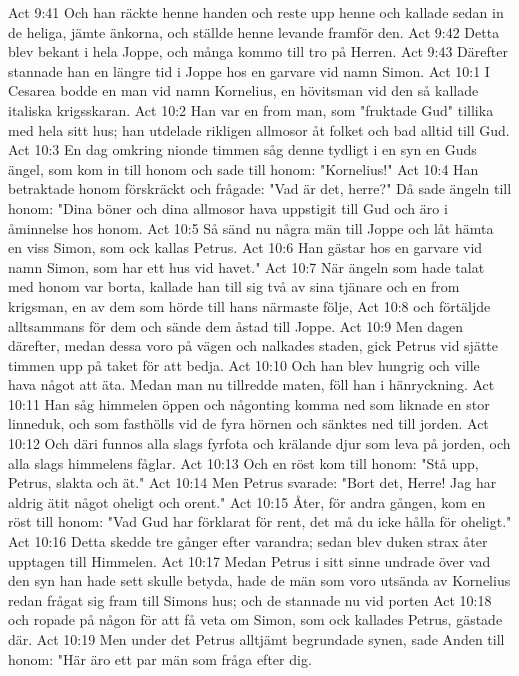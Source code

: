 Act 9:41  Och han räckte henne handen och reste upp henne och kallade sedan in de heliga, jämte änkorna, och ställde henne levande framför den.
Act 9:42  Detta blev bekant i hela Joppe, och många kommo till tro på Herren.
Act 9:43  Därefter stannade han en längre tid i Joppe hos en garvare vid namn Simon.
Act 10:1  I Cesarea bodde en man vid namn Kornelius, en hövitsman vid den så kallade italiska krigsskaran.
Act 10:2  Han var en from man, som "fruktade Gud" tillika med hela sitt hus; han utdelade rikligen allmosor åt folket och bad alltid till Gud.
Act 10:3  En dag omkring nionde timmen såg denne tydligt i en syn en Guds ängel, som kom in till honom och sade till honom: "Kornelius!"
Act 10:4  Han betraktade honom förskräckt och frågade: "Vad är det, herre?" Då sade ängeln till honom: "Dina böner och dina allmosor hava uppstigit till Gud och äro i åminnelse hos honom.
Act 10:5  Så sänd nu några män till Joppe och låt hämta en viss Simon, som ock kallas Petrus.
Act 10:6  Han gästar hos en garvare vid namn Simon, som har ett hus vid havet."
Act 10:7  När ängeln som hade talat med honom var borta, kallade han till sig två av sina tjänare och en from krigsman, en av dem som hörde till hans närmaste följe,
Act 10:8  och förtäljde alltsammans för dem och sände dem åstad till Joppe.
Act 10:9  Men dagen därefter, medan dessa voro på vägen och nalkades staden, gick Petrus vid sjätte timmen upp på taket för att bedja.
Act 10:10  Och han blev hungrig och ville hava något att äta. Medan man nu tillredde maten, föll han i hänryckning.
Act 10:11  Han såg himmelen öppen och någonting komma ned som liknade en stor linneduk, och som fasthölls vid de fyra hörnen och sänktes ned till jorden.
Act 10:12  Och däri funnos alla slags fyrfota och krälande djur som leva på jorden, och alla slags himmelens fåglar.
Act 10:13  Och en röst kom till honom: "Stå upp, Petrus, slakta och ät."
Act 10:14  Men Petrus svarade: "Bort det, Herre! Jag har aldrig ätit något oheligt och orent."
Act 10:15  Åter, för andra gången, kom en röst till honom: "Vad Gud har förklarat för rent, det må du icke hålla för oheligt."
Act 10:16  Detta skedde tre gånger efter varandra; sedan blev duken strax åter upptagen till Himmelen.
Act 10:17  Medan Petrus i sitt sinne undrade över vad den syn han hade sett skulle betyda, hade de män som voro utsända av Kornelius redan frågat sig fram till Simons hus; och de stannade nu vid porten
Act 10:18  och ropade på någon för att få veta om Simon, som ock kallades Petrus, gästade där.
Act 10:19  Men under det Petrus alltjämt begrundade synen, sade Anden till honom: "Här äro ett par män som fråga efter dig.
